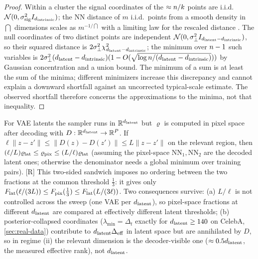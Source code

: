 \begin{proof}
Within a cluster the signal coordinates of the $\approx n/k$ points are i.i.d.\ $\mathcal N(0,\sigma_{\mathrm{sig}}^2I_{d_{\mathrm{intrinsic}}})$; the NN distance of $m$ i.i.d.\ points from a smooth density in $\dint$ dimensions scales as $m^{-1/\dint}$ with a limiting law for the rescaled distance \citep{levina2004maximum,facco2017twonn}. The null coordinates of two distinct points are independent $\mathcal N(0,\sigma_{\perp}^2I_{d_{\mathrm{latent}}-d_{\mathrm{intrinsic}}})$, so their squared distance is $2\sigma_{\perp}^2\chi^2_{d_{\mathrm{latent}}-d_{\mathrm{intrinsic}}}$; the minimum over $n-1$ such variables is $2\sigma_{\perp}^2(d_{\mathrm{latent}}-d_{\mathrm{intrinsic}})(1-O(\sqrt{\log n/(d_{\mathrm{latent}}-d_{\mathrm{intrinsic}})}))$ by Gaussian concentration and a union bound. The minimum of a sum is at least the sum of the minima; different minimizers increase this discrepancy and cannot explain a downward shortfall against an uncorrected typical-scale estimate. The observed shortfall therefore concerns the approximations to the minima, not that inequality.
\end{proof}

\begin{remark}\label{rem:pixel}
For VAE latents the sampler runs in $\mathbb{R}^{d_{\mathrm{latent}}}$ but $\varrho$ is computed in pixel space after decoding with $D:\mathbb{R}^{d_{\mathrm{latent}}}\to\mathbb{R}^{P}$. If $\ell\|z-z'\|\le\|D(z)-D(z')\|\le L\|z-z'\|$ on the relevant region, then $(\ell/L)\varrho_{\rm lat}\le\varrho_{\rm pix}\le(L/\ell)\varrho_{\rm lat}$ (assuming the pixel-space $\mathrm{NN}_1,\mathrm{NN}_2$ are the decoded latent ones; otherwise the denominator needs a global minimum over training pairs). [R] This two-sided sandwich imposes no ordering between the two fractions at the common threshold $\tfrac13$: it gives only $F_{\rm lat}(\ell/(3L))\le F_{\rm pix}(\tfrac13)\le F_{\rm lat}(L/(3\ell))$. Two consequences survive: (a) $L/\ell$ is not controlled across the sweep (one VAE per $d_{\mathrm{latent}}$), so pixel-space fractions at different $d_{\mathrm{latent}}$ are compared at effectively different latent thresholds; (b) posterior-collapsed coordinates ($\lambda_{\min}=\Delta_t$ exactly for $d_{\mathrm{latent}}\ge140$ on CelebA, \cref{sec:real-data}) contribute to $d_{\mathrm{latent}}\Delta_{\rm eff}$ in latent space but are annihilated by $D$, so in regime (ii) the relevant dimension is the decoder-visible one ($\approx0.5d_{\mathrm{latent}}$, the measured effective rank), not $d_{\mathrm{latent}}$.
\end{remark}

